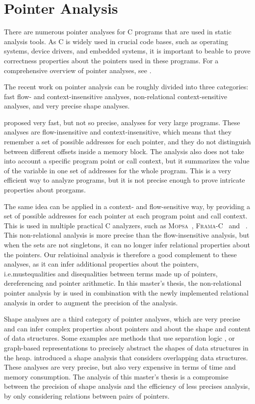 \section{Pointer Analysis}

There are numerous pointer analyses for C programs that are used in static analysis tools.
As C is widely used in crucial code bases, such as operating systems, device drivers, and embedded systems,
it is important to beable to prove correctness properties about the pointers used in these programs.
For a comprehensive overview of pointer analyses, see \textcite{pointeranalysis}.

The recent work on pointer analysis can be roughly divided into three categories:
fast flow- and context-insensitive analyses, non-relational context-sensitive analyses, and very precise shape analyses.

\textcite{Andersen,Steensgaard} proposed very fast, but not so precise, analyses for very large programs.
These analyses are flow-insensitive and context-insensitive, which means that they remember a set of possible
addresses for each pointer, and they do not distinguish between different offsets inside a memory block.
The analysis also does not take into account a specific program point or call context, but it summarizes the
value of the variable in one set of addresses for the whole program.
This is a very efficient way to analyze programs, but it is not precise enough to prove intricate properties about prorgams.

The same idea can be applied in a context- and flow-sensitive way, by providing a set of possible addresses for each pointer at each program point and call context.
This is used in multiple practical C analyzers, such as \textsc{Mopsa}~\cite{mopsa}, \textsc{Frama-C}~\cite{framac,Bühler2024} and \goblint~\cite{goblint}.
This non-relational analysis is more precise than the flow-insensitive analysis, but when the sets are not singletons,
it can no longer infer relational properties about the pointers.
Our relatioinal analysis is therefore a good complement to these analyses, as it can infer additional
properties about the pointers, i.e.mustequalities and disequalities between terms made up of pointers, dereferencing and pointer arithmetic.
In this master's thesis, the non-relational pointer analysis by \textcite{goblint} is used in combination
with the newly implemented relational analysis in order to augment the precision of the analysis.

Shape analyses are a third category of pointer analyses, which are very precise and can infer complex properties about pointers and about the shape and content of data structures.
Some examples are methods that use separation logic \cite{separationlogic,rivalpapers},
or graph-based representations \cite{predator} to precisely abstract the shapes of data structures in the heap.
\textcite{kreiker} introduced a shape analysis that considers overlapping data structures.
These analyses are very precise, but also very expensive in terms of time and memory consumption.
The analysis of this master's thesis is a compromise between the precision of shape analysis and
the efficiency of less precises analysis, by only considering relations between pairs of pointers.

